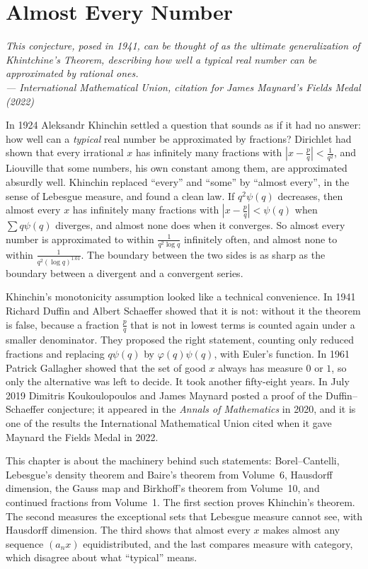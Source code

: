 \chapter{Almost Every Number}

\begin{center}\itshape
This conjecture, posed in 1941, can be thought of as the ultimate generalization of Khintchine's Theorem, describing how well a
typical real number can be approximated by rational ones.\\
\upshape --- International Mathematical Union, citation for James Maynard's Fields Medal (2022)
\end{center}

In 1924 Aleksandr Khinchin settled a question that sounds as if it had no answer: how well can a \emph{typical} real number be
approximated by fractions? Dirichlet had shown that every irrational $x$ has infinitely many fractions with $|x-\frac pq|<\frac1{q^2}$,
and Liouville that some numbers, his own constant among them, are approximated absurdly well. Khinchin replaced ``every'' and
``some'' by ``almost every'', in the sense of Lebesgue measure, and found a clean law. If $q^2\psi(q)$ decreases, then almost every
$x$ has infinitely many fractions with $|x-\frac pq|<\psi(q)$ when $\sum q\psi(q)$ diverges, and almost none does when it converges. So
almost every number is approximated to within $\frac1{q^2\log q}$ infinitely often, and almost none to within
$\frac1{q^2(\log q)^{1.01}}$. The boundary between the two sides is as sharp as the boundary between a divergent and a convergent series.

Khinchin's monotonicity assumption looked like a technical convenience. In 1941 Richard Duffin and Albert Schaeffer showed that it is
not: without it the theorem is false, because a fraction $\frac pq$ that is not in lowest terms is counted again under a smaller
denominator. They proposed the right statement, counting only reduced fractions and replacing $q\psi(q)$ by $\varphi(q)\psi(q)$, with
Euler's function. In 1961 Patrick Gallagher showed that the set of good $x$ always has measure $0$ or $1$, so only the
alternative was left to decide. It took another fifty-eight years. In July 2019 Dimitris Koukoulopoulos and James Maynard posted a
proof of the Duffin--Schaeffer conjecture; it appeared in the \emph{Annals of Mathematics} in 2020, and it is one of the results the
International Mathematical Union cited when it gave Maynard the Fields Medal in 2022.

This chapter is about the machinery behind such statements: Borel--Cantelli, Lebesgue's density theorem and Baire's theorem from
Volume~6, Hausdorff dimension, the Gauss map and Birkhoff's theorem from Volume~10, and continued fractions from Volume~1. The first section
proves Khinchin's theorem. The second measures the exceptional sets that Lebesgue measure cannot see, with Hausdorff dimension. The
third shows that almost every $x$ makes almost any sequence $(a_nx)$ equidistributed, and the last compares measure with category,
which disagree about what ``typical'' means.

